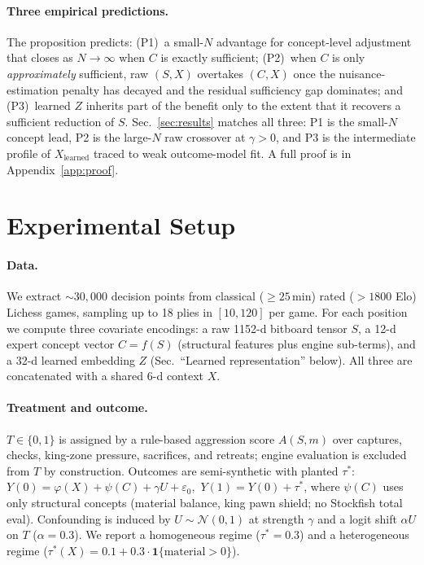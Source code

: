 \documentclass{article}
\begin{document}
\paragraph{Three empirical predictions.}
The proposition predicts: (P1)~a small-$N$ advantage for concept-level
adjustment that closes as $N\to\infty$ when $C$ is exactly sufficient;
(P2)~when $C$ is only \emph{approximately} sufficient, raw $(S,X)$ overtakes
$(C,X)$ once the nuisance-estimation penalty has decayed and the residual
sufficiency gap dominates; and (P3)~learned $Z$ inherits part of the benefit
only to the extent that it recovers a sufficient reduction of $S$.
Sec.~\ref{sec:results} matches all three: P1 is the small-$N$ concept lead,
P2 is the large-$N$ raw crossover at $\gamma>0$, and P3 is the intermediate
profile of $X_{\text{learned}}$ traced to weak outcome-model fit. A full
proof is in Appendix~\ref{app:proof}.

\section{Experimental Setup}

\paragraph{Data.}
We extract ${\sim}30{,}000$ decision points from classical ($\geq 25$\,min)
rated ($>1800$ Elo) Lichess games, sampling up to 18 plies in $[10,120]$ per
game. For each position we compute three covariate encodings: a raw 1152-d
bitboard tensor $S$, a 12-d expert concept vector $C=f(S)$ (structural features
plus engine sub-terms\cite{stockfish}), and a 32-d learned embedding $Z$
(Sec.~``Learned representation'' below). All three are concatenated with a
shared 6-d context $X$.

\paragraph{Treatment and outcome.}
$T\in\{0,1\}$ is assigned by a rule-based aggression score $A(S,m)$ over
captures, checks, king-zone pressure, sacrifices, and retreats; engine
evaluation is excluded from $T$ by construction. Outcomes are semi-synthetic
with planted $\tau^*$:
$Y(0)=\varphi(X)+\psi(C)+\gamma U+\varepsilon_0$,\ $Y(1)=Y(0)+\tau^*$, where
$\psi(C)$ uses only structural concepts (material balance, king pawn shield;
no Stockfish total eval). Confounding is induced by $U\sim\mathcal{N}(0,1)$ at
strength $\gamma$ and a logit shift $\alpha U$ on $T$ ($\alpha=0.3$). We
report a homogeneous regime ($\tau^*=0.3$) and a heterogeneous regime
($\tau^*(X)=0.1+0.3\cdot\mathbf{1}\{\text{material}>0\}$).
\end{document}
